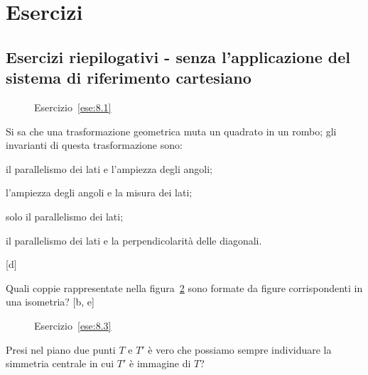 
\section{Esercizi}

\subsection{Esercizi riepilogativi - senza l'applicazione del sistema di riferimento cartesiano}

\begin{inaccessibleblock}
 \begin{figure}[!htb]
  \centering
  \caption{Esercizio~\ref{ese:8.1}}\label{fig:ese8.1}
\end{figure}
\end{inaccessibleblock}

\begin{esercizio}
\label{ese:8.2}
Si sa che una trasformazione geometrica muta un quadrato in un rombo; 
gli invarianti di questa trasformazione sono:
\begin{enumeratea}
\item il parallelismo dei lati e l'ampiezza degli angoli;
\item l'ampiezza degli angoli e la misura dei lati;
\item solo il parallelismo   dei lati;
\item il parallelismo dei lati e la perpendicolarità delle diagonali.
\end{enumeratea}
\hfill [d]
\end{esercizio}

\begin{esercizio}
\label{ese:8.3}
Quali coppie rappresentate nella figura~\ref{fig:ese8.3} sono formate 
da figure corrispondenti in una isometria? \hfill [b, e]
\end{esercizio}


\begin{inaccessibleblock}
 \begin{figure}[!htb]
  \centering
  \caption{Esercizio~\ref{ese:8.3}}\label{fig:ese8.3}
\end{figure}
\end{inaccessibleblock}

\begin{esercizio}
\label{ese:8.4}
Presi nel piano due punti $T$ e $T'$ è vero che possiamo sempre 
individuare la simmetria centrale in cui $T'$ è immagine di $T$?
\end{esercizio}

